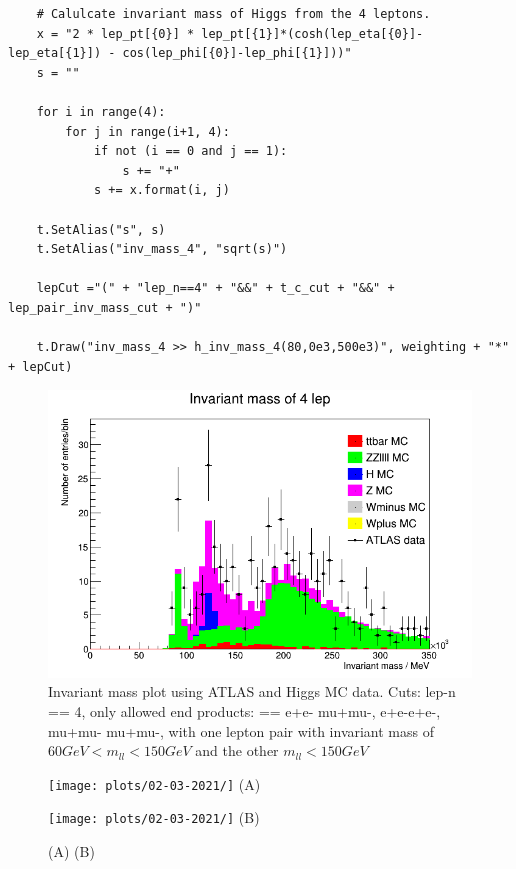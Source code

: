 \begin{lstlisting}
    # Calulcate invariant mass of Higgs from the 4 leptons.
    x = "2 * lep_pt[{0}] * lep_pt[{1}]*(cosh(lep_eta[{0}]-lep_eta[{1}]) - cos(lep_phi[{0}]-lep_phi[{1}]))"
    s = ""

    for i in range(4):
        for j in range(i+1, 4):
            if not (i == 0 and j == 1):
                s += "+"
            s += x.format(i, j)
 
    t.SetAlias("s", s)
    t.SetAlias("inv_mass_4", "sqrt(s)")

    lepCut ="(" + "lep_n==4" + "&&" + t_c_cut + "&&" + lep_pair_inv_mass_cut + ")"
    
    t.Draw("inv_mass_4 >> h_inv_mass_4(80,0e3,500e3)", weighting + "*" + lepCut)
\end{lstlisting}

\begin{figure}[h!]
    \centering
	\includegraphics[width=0.85\linewidth]{plots/02-03-2021/18-00.png}
    \caption{Invariant mass plot using ATLAS and Higgs MC data.  Cuts: lep-n == 4, only allowed end products: == e+e- mu+mu-, e+e-e+e-, mu+mu- mu+mu-, with one lepton pair with invariant mass of $60 GeV < m_{ll} < 150 GeV$ and the other $m_{ll} < 150 GeV$}
    \label{fig:18:00_02-03-21}
\end{figure}
\begin{figure}[h!]
    \centering
    \begin{minipage}{0.5\textwidth}
        \centering
        \texttt{[image: plots/02-03-2021/]}
        (A)
    \end{minipage}\hfill
    \begin{minipage}{0.5\textwidth}
        \centering
        \texttt{[image: plots/02-03-2021/]}
        (B)
    \end{minipage}
    \caption{(A)  (B)}
    \label{}
\end{figure}

